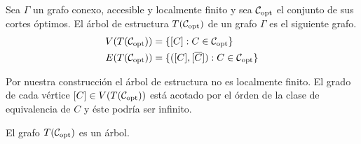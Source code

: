 \documentclass[tesis.tex]{subfiles}
\begin{document}
\begin{deff}
	Sea $\Gamma$ un grafo conexo, accesible y localmente finito y sea ${\cal C}_{\text{opt}}$ el conjunto de sus cortes óptimos.
	El árbol de estructura $T({\cal C}_{\text{opt}})$ de un grafo $\Gamma$ es el siguiente grafo.
	\begin{align*}
		V(T({\cal C}_{\text{opt}})) &= \{ [C] : C \in {\cal C}_{\text{opt}} \} \\
		E(T({\cal C}_{\text{opt}})) &= \{ ([C], [\overline C]) : C \in {\cal C}_{\text{opt}}   \}
	\end{align*}
\end{deff}

\begin{obs}
	Por nuestra construcción el árbol de estructura no es localmente finito.
	El grado de cada vértice $[C] \in V(T({\cal C}_{\text{opt}}))$ está acotado por el órden de la clase de equivalencia de $C$ y éste podría ser infinito.
\end{obs}

\begin{prop}
	El grafo $T({\cal C}_{\text{opt}})$ es un árbol.
\end{prop}
\end{document}

